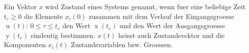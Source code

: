 Ein Vektor $x$ wird Zustand eines Systems genannt, wenn fuer eine beliebige Zeit $t_{e} \geq 0$ die Elemente $x_i(0)$ zusammen mit dem Verlauf der Eingangsgroesse $\operatorname{u}(t): \, 0 \leq \tau \leq t_e$ den Wert $\operatorname{x}(t_{e})$ und den Wert der Ausgangsgroesse $\operatorname{y}(t_{e})$ eindeutig bestimmen. $x(t)$ heisst auch Zustandsvektor und die Komponenten $x_{i}(t)$ Zustandsvariablen bzw. Groessen.  
